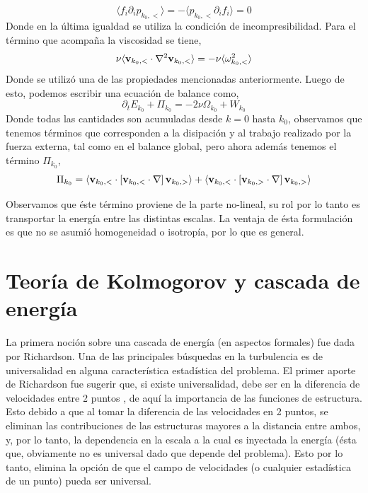 \documentclass[executivepaper,12pt]{article}
\numberwithin{equation}{section}
\begin{document}
 \begin{equation*}
 	\langle f_i \partial_i p_{k_0,<}\rangle=-\langle  p_{k_0,<}  \partial_i f_i\rangle=0
 \end{equation*}
 Donde en la última igualdad se utiliza la condición de incompresibilidad. Para el término que acompaña la viscosidad se tiene,
 \begin{equation*}
 	\nu\langle \vb{v}_{k_0,<}\cdot\nabla^2\vb{v}_{k_0,<}\rangle=-\nu\langle\vb{\omega}_{k_0,<}^2\rangle
 \end{equation*}
 Donde se utilizó una de las propiedades mencionadas anteriormente. Luego de esto, podemos escribir una ecuación de balance como,
 \begin{equation*}
 	\partial_t E_{k_0}+\Pi_{k_0}=-2\nu\Omega_{k_0}+W_{k_0} 
 \end{equation*}
 Donde todas las cantidades son acumuladas desde $k=0$ hasta $k_0$, observamos que tenemos términos que corresponden a la disipación y al trabajo realizado por la fuerza externa, tal como en el balance global, pero ahora además tenemos el término  $\Pi_{k_0}$,
 \begin{equation*}
 	\Pi_{k_0}=\langle \vb{v}_{k_0,<} \cdot \left[\vb{v}_{k_0,<}\cdot\vb{\nabla}\right]\vb{v}_{k_0,>}\rangle+\langle \vb{v}_{k_0,<} \cdot \left[\vb{v}_{k_0,>}\cdot\vb{\nabla}\right]\vb{v}_{k_0,>}\rangle
 \end{equation*}
 
 Observamos que éste término proviene de la parte no-lineal, su rol por lo tanto es transportar la energía entre las distintas escalas. La ventaja de ésta formulación es que no se asumió homogeneidad o isotropía, por lo que es general. 
\section{Teoría de Kolmogorov y cascada de energía}



La primera noción sobre una cascada de energía (en aspectos formales) fue dada por Richardson. Una de las principales búsquedas en la turbulencia es de universalidad en alguna característica estadística del problema. El primer aporte de Richardson fue sugerir que, si existe universalidad, debe ser en la diferencia de velocidades entre 2 puntos \parencite{lvov1995}, de aquí la importancia de las funciones de estructura. Esto debido a que al tomar la diferencia de las velocidades en 2 puntos, se eliminan las contribuciones de las estructuras mayores a la distancia entre ambos, y, por lo tanto, la dependencia en la escala a la cual es inyectada la energía (ésta que, obviamente no es universal dado que depende del problema). Esto por lo tanto, elimina la opción de que el campo de velocidades (o cualquier estadística de un punto) pueda ser universal. \\
\end{document}
